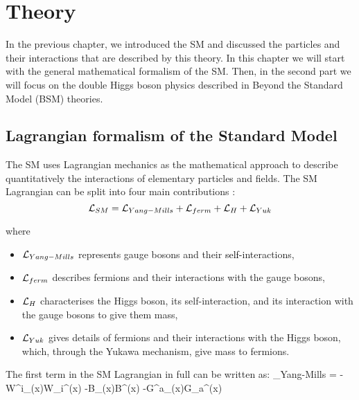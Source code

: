 
\chapter{Theory}
\label{ch:theory}


In the previous chapter, we introduced the SM and discussed the particles and their interactions that are described by this theory. In this chapter we will start with the general mathematical formalism of the SM. Then, in the second part we will focus on the double Higgs boson physics described in Beyond the Standard Model (BSM) theories.

\section{Lagrangian formalism of the Standard Model}


\indent The SM uses Lagrangian mechanics as the mathematical approach to describe quantitatively the interactions of elementary particles and fields. 
The SM Lagrangian can be split into four main contributions \cite{Mozer:2016wzi}:
\begin{equation}\label{lagr_SM}
\mathcal{L}_{SM} = \mathcal{L}_{Yang-Mills} + \mathcal{L}_{ferm} + \mathcal{L}_{H} + \mathcal{L}_{Yuk} 
\end{equation}

\noindent where

\begin{itemize}
\item $\mathcal{L}_{Yang-Mills}$ represents gauge bosons and their \textcolor{black}{self-}interactions,
\item $\mathcal{L}_{ferm}$ describes fermions and their interactions with the gauge bosons, 
\item $\mathcal{L}_{H}$ characterises the Higgs boson, its self-interaction, and its interaction with the gauge bosons to give them mass, 
\item $\mathcal{L}_{Yuk} $ gives details of fermions and their interactions with the Higgs boson, which, through the Yukawa mechanism, give mass to fermions.
\end{itemize}
 

The first term in the SM Lagrangian in full can be written as:
\beqn\label{lagr_Yang-Mills}
\Lagr_{Yang-Mills} = 	-W^i_{\mu\nu}(x)W_i^{\mu\nu}(x) -B_{\mu\nu}(x)B^{\mu\nu}(x) -G^a_{\mu\nu}(x)G_a^{\mu\nu}(x)
\eeqn

